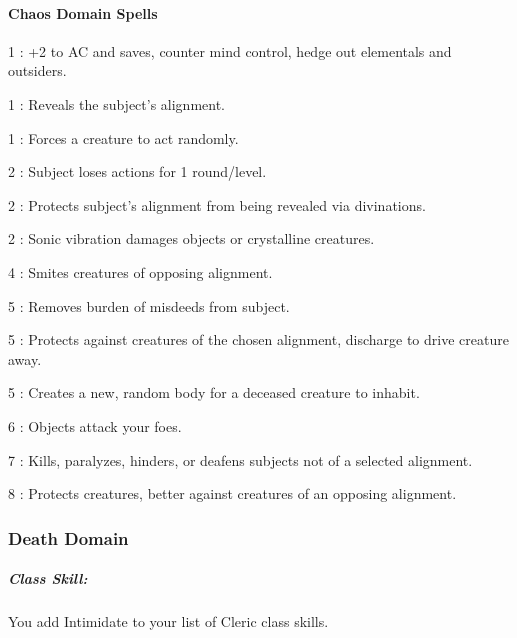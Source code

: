\paragraph{Chaos Domain Spells}
\begin{list}{}{\leftmargin=1em}
\item[1] : +2 to AC and saves, counter mind control, hedge out elementals and outsiders.
\item[1] : Reveals the subject's alignment.
\item[1] : Forces a creature to act randomly.
\item[2] : Subject loses actions for 1 round/level.
\item[2] : Protects subject's alignment from being revealed via divinations.
\item[2] : Sonic vibration damages objects or crystalline creatures.
\item[4] : Smites creatures of opposing alignment.
\item[5] : Removes burden of misdeeds from subject.
\item[5] : Protects against creatures of the chosen alignment, discharge to drive creature away.
\item[5] : Creates a new, random body for a deceased creature to inhabit.
\item[6] : Objects attack your foes.
\item[7] : Kills, paralyzes, hinders, or deafens subjects not of a selected alignment.
\item[8] : Protects creatures, better against creatures of an opposing alignment.
\end{list}
\subsubsection{Death Domain}
\subparagraph{Class Skill:}
You add Intimidate to your list of Cleric class skills.
